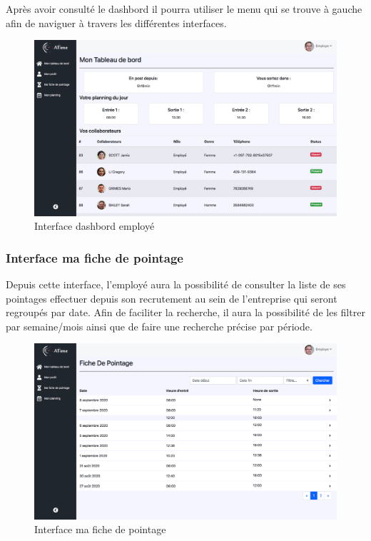 Après avoir consulté le dashbord il pourra utiliser le menu qui se trouve à 
gauche afin de naviguer à travers les différentes interfaces.

\begin{figure}[h!]
    \centering
    \includegraphics[scale=0.35 ]{images/interface/dashbord_employe.png}
    \caption{Interface dashbord employé}
    \label{fig92}
\end{figure}

                
\subsubsection*{Interface ma fiche de pointage}
Depuis cette interface, l’employé aura la possibilité de consulter la liste de 
ses pointages effectuer depuis son recrutement au sein de l’entreprise qui 
seront regroupés par date. Afin de faciliter la recherche, il aura la 
possibilité de les filtrer par semaine/mois ainsi que de faire une recherche 
précise par période. 
            
\begin{figure}[h!]
    \vspace{-10pt}
    \centering
    \includegraphics[scale=0.306 ]{images/interface/fiche_pointage.png}
    \caption{Interface ma fiche de pointage}
    \label{fig93}
\end{figure}

